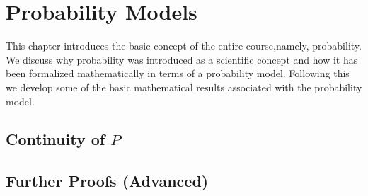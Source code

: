 \chapter{Probability Models}\label{chap:probability_models}
\minitoc
This chapter introduces the basic concept of the entire course,\linebreak[2] namely, probability. We discuss why probability was introduced as a scientific concept and how it has been formalized mathematically in terms of a probability model. Following this we develop some of the basic mathematical results associated with the probability model.







\section{Continuity of $P$}
\lipsum[1-10]

\section{Further Proofs (Advanced)}\label{ch2:adv_proofs}
\lipsum[1-10]